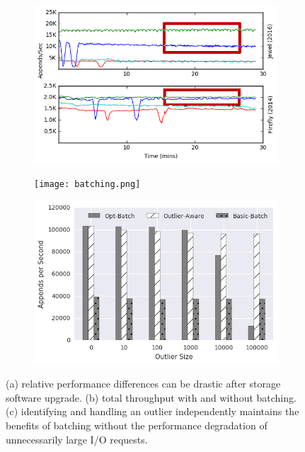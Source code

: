 \begin{figure}[t]
    \centering
    \begin{subfigure}[b]{.33\linewidth}
        \centering
        \includegraphics[width=1.0\linewidth]{jewel_v_firefly_pd.png}
        \caption{}
        \label{fig:phy-design}
    \end{subfigure}
    \begin{subfigure}[b]{.33\linewidth}
        \centering
        \texttt{[image: batching.png]}
        \caption{}
        \label{fig:batching}
    \end{subfigure}
    \begin{subfigure}[b]{.33\linewidth}
        \centering
        \includegraphics[width=1.0\linewidth]{batching-outlier-detect.png}
        \caption{}
        \label{fig:batching-outlier}
    \end{subfigure}
    \caption{(a) relative performance differences can be drastic after storage
    software upgrade. (b) total throughput with and without batching.  (c)
    identifying and handling an outlier independently maintains the benefits
    of batching without the performance degradation of unnecessarily large I/O
    requests.}
\end{figure}

